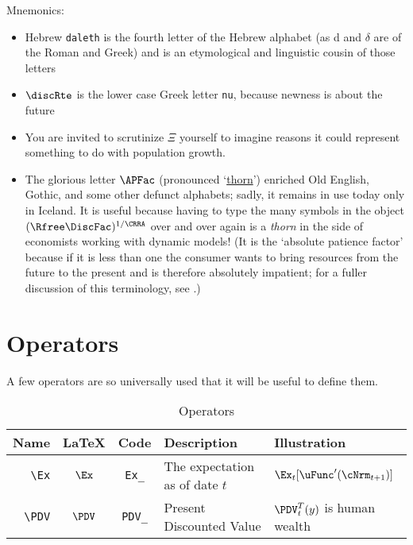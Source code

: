 \documentclass{econark}
\begin{document}
Mnemonics:
\begin{itemize}
\item Hebrew \texttt{daleth} is the fourth letter of the Hebrew alphabet (as d and $\delta$ are of the Roman and Greek) and is an etymological and linguistic cousin of those letters
\item $\discRte$ is the lower case Greek letter \texttt{nu}, because newness is about the future
\item You are invited to scrutinize $\Xi$ yourself to imagine reasons it could represent something to do with population growth.
\item The glorious letter $\APFac$ (pronounced `\href{https://en.wikipedia.org/wiki/Thorn_(letter)}{thorn}') enriched Old English, Gothic, and some other defunct alphabets; sadly, it remains in use today only in Iceland.  It is useful because having to type the many symbols in the object $(\Rfree \DiscFac)^{1/\CRRA}$ over and over again is a \textit{thorn} in the side of economists working with dynamic models!  (It is the `absolute patience factor' because if it is less than one the consumer wants to bring resources from the future to the present and is therefore absolutely impatient; for a fuller discussion of this terminology, see \cite{carrollTractable}.)
\end{itemize}


\hypertarget{Operators}{}
\section{Operators}
A few operators are so universally used that it will be useful to define them.

\begin{table}[ht]
  \centering
  \begin{tabular}{|>{\ttfamily}rccll|}
    \hline
    Name    & \LaTeX         & Code & Description & Illustration
    \\ \hline
    \verb|\Ex|        & $\Ex$       & \texttt{Ex\_} & The expectation as of date $t$ & $\Ex_{t}[\uFunc^{\prime}(\cNrm_{t+1})]$
    \\   \verb|\PDV|        & $\PDV$       & \texttt{PDV\_} & Present Discounted Value & $\PDV_{t}^{T}(y)$ is human wealth
    \\	\hline
  \end{tabular}
  \caption{Operators}
  \label{table:Operators}
\end{table}



\hypertarget{Modifiers}{}
\end{document}
